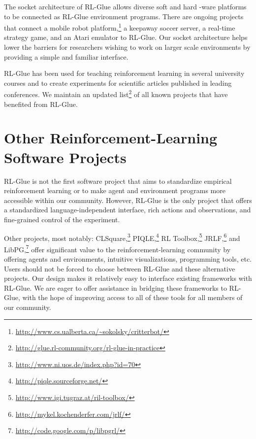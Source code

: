 \documentclass[twoside,11pt]{article}
\begin{document}
The socket architecture of RL-Glue allows diverse soft and hard -ware platforms to be connected as RL-Glue environment programs.  There are ongoing projects that connect a mobile robot platform,\footnote{\url{http://www.cs.ualberta.ca/~sokolsky/critterbot/}} a  keepaway soccer server, a real-time strategy game, and an Atari emulator to RL-Glue. Our socket architecture helps lower the barriers for researchers wishing to work on larger scale environments by providing a simple and familiar interface. %

RL-Glue has been used for teaching reinforcement learning in several university courses and to create experiments for scientific articles published in leading conferences. We maintain an updated list\footnote{\url{http://glue.rl-community.org/rl-glue-in-practice}} of all known projects that have benefited from RL-Glue.



\section{Other Reinforcement-Learning Software Projects}
RL-Glue is not the first software project that aims to  standardize empirical reinforcement learning or to make agent and environment programs more accessible within our community.  However, RL-Glue is the only project that offers a standardized language-independent interface, rich actions and observations, and fine-grained control of the experiment.

Other projects, most notably: CLSquare,\footnote{\url{http://www.ni.uos.de/index.php?id=70}}  PIQLE,\footnote{\url{http://piqle.sourceforge.net/}} RL Toolbox,\footnote{\url{http://www.igi.tugraz.at/ril-toolbox/}
} JRLF,\footnote{\url{http://mykel.kochenderfer.com/jrlf/}}  and LibPG,\footnote{\url{http://code.google.com/p/libpgrl/}} offer significant value to the reinforcement-learning community by offering agents and environments, intuitive visualizations, programming tools, etc.  Users should not be forced to choose between RL-Glue and these alternative projects. Our design makes it relatively easy to interface existing frameworks with RL-Glue.  We are eager to offer assistance in bridging these frameworks to RL-Glue, with the hope of improving access to all of these tools for all members of our community.





 
 
\end{document}
